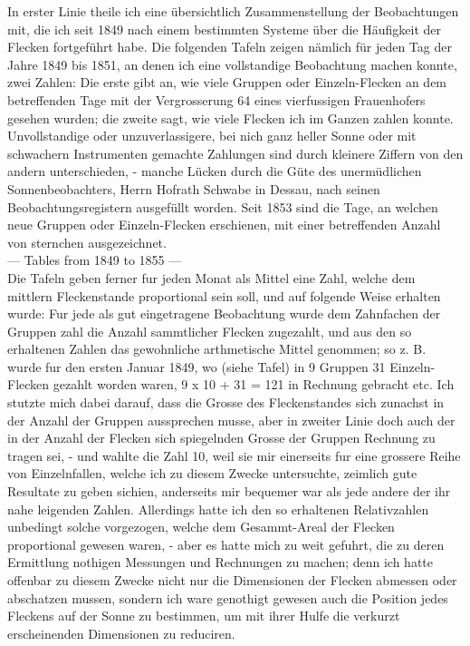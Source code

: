 \documentclass[12pt]{article}
\begin{document}
In erster Linie theile ich eine übersichtlich Zusammenstellung der Beobachtungen mit, die ich seit 1849 nach einem bestimmten Systeme über die Häufigkeit der Flecken fortgeführt habe. Die folgenden Tafeln zeigen nämlich für jeden Tag der Jahre 1849 bis 1851, an denen ich eine vollstandige Beobachtung machen konnte, zwei Zahlen: Die erste gibt an, wie viele Gruppen oder Einzeln-Flecken an dem betreffenden Tage mit der Vergrosserung 64 eines vierfussigen Frauenhofers gesehen wurden; die zweite sagt, wie viele Flecken ich im Ganzen zahlen konnte. Unvollstandige oder unzuverlassigere, bei nich ganz heller Sonne oder mit schwachern Instrumenten gemachte Zahlungen sind durch kleinere Ziffern von den andern unterschieden, - manche Lücken durch die Güte des unermüdlichen Sonnenbeobachters, Herrn Hofrath Schwabe in Dessau, nach seinen Beobachtungsregistern ausgefüllt worden. Seit 1853 sind die Tage, an welchen neue Gruppen oder Einzeln-Flecken erschienen, mit einer betreffenden Anzahl von sternchen ausgezeichnet.\\

--- Tables from 1849 to 1855 ---\\

Die Tafeln geben ferner fur jeden Monat als Mittel eine Zahl, welche dem mittlern Fleckenstande proportional sein soll, und auf folgende Weise erhalten wurde: Fur jede als gut eingetragene Beobachtung wurde dem Zahnfachen der Gruppen zahl die Anzahl sammtlicher Flecken zugezahlt, und aus den so erhaltenen Zahlen das gewohnliche arthmetische Mittel genommen; so z. B. wurde fur den ersten Januar 1849, wo (siehe Tafel) in 9 Gruppen 31 Einzeln-Flecken gezahlt worden waren, 9 x 10 + 31 = 121 in Rechnung gebracht etc. Ich stutzte mich dabei darauf, dass die Grosse des Fleckenstandes sich zunachst in der Anzahl der Gruppen aussprechen musse, aber in zweiter Linie doch auch der in der Anzahl der Flecken sich spiegelnden Grosse der Gruppen Rechnung zu tragen sei, - und wahlte die Zahl 10, weil sie mir einerseits fur eine grossere Reihe von Einzelnfallen, welche ich zu diesem Zwecke untersuchte, zeimlich gute Resultate zu geben sichien, anderseits mir bequemer war als jede andere der ihr nahe leigenden Zahlen. Allerdings hatte ich den so erhaltenen Relativzahlen unbedingt solche vorgezogen, welche dem Gesammt-Areal der Flecken proportional gewesen waren, - aber es hatte mich zu weit gefuhrt, die zu deren Ermittlung nothigen Messungen und Rechnungen zu machen; denn ich hatte offenbar zu diesem Zwecke nicht nur die Dimensionen der Flecken abmessen oder abschatzen mussen, sondern ich ware genothigt gewesen auch die Position jedes Fleckens auf der Sonne zu bestimmen, um mit ihrer Hulfe die verkurzt erscheinenden Dimensionen zu reduciren.\\
\end{document}
